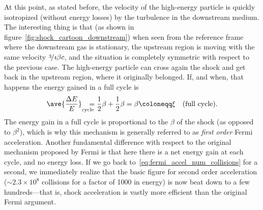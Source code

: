 \begin{marginfigure}
  
  \caption{Schematic view of a parallel shock in the reference frame where the
  velocity distribution for the downstream gas is isotropic.}
  \label{fig:shock_cartoon_downstream}
\end{marginfigure}

At this point, as stated before, the velocity of the high-energy particle is quickly
isotropized (without energy losses) by the turbulence in the downstream medium.
The interesting thing is that (as shown in figure~\ref{fig:shock_cartoon_downstream})
when seen from the reference frame where the downstream gas is stationary, the
upstream region is moving with the same velocity $\nicefrac{3}{4} \beta c$, and the
situation is completely symmetric with respect to the previous case.
The high-energy particle can cross again the shock and get back in the upstream
region, where it originally belonged. If, and when, that happens the energy gained
in a full cycle is
\begin{align}
  \ave{\frac{\Delta E}{E}}_\text{cycle} \!\!\!\!\!\! =
  \frac{1}{2} \beta + \frac{1}{2} \beta =
  \beta \coloneqq \xi \quad\text{(full cycle)}.
\end{align}
The energy gain in a full cycle is proportional to the $\beta$ of the shock
(as opposed to $\beta^2$), which is why this mechanism is generally referred to as
\emph{first order} Fermi acceleration. Another fundamental difference with respect to
the original mechanism proposed by Fermi is that here there is a net energy
gain at each cycle, and no energy loss.
If we go back to~\eqref{eq:fermi_accel_num_collisions} for a second, we immediately
realize that the basic figure for second order acceleration ($\sim 2.3 \times 10^8$
collisions for a factor of 1000 in energy) is now beat down to a few
hundreds---that is, shock acceleration is vastly more efficient
than the original Fermi argument.

